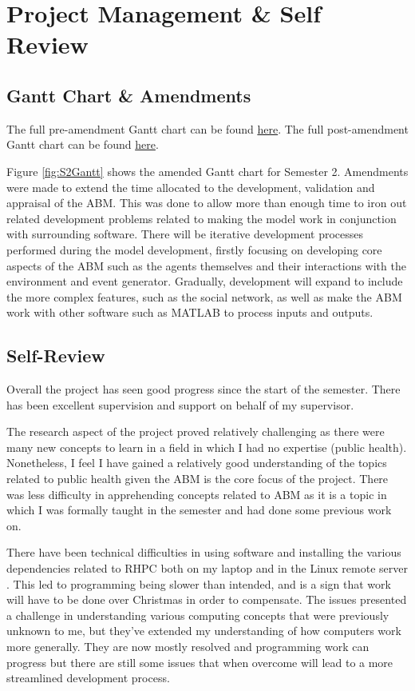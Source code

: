 \chapter{Project Management \& Self Review}

\section{Gantt Chart \& Amendments}
The full pre-amendment Gantt chart can be found \href{https://www.notion.so/zuddas/9c097f57d9d844da8fc7f8733b38289f?v=61d021af0d9d40ebab7b2a6fbe6b3bd8}{here}. 
The full post-amendment Gantt chart can be found \href{https://www.notion.so/zuddas/ee42fe3d801947d08c59b69aa2e4f0cd?v=13936a7a4a4a4cff9e9fc01ff24508cb}{here}. 

Figure \ref{fig:S2Gantt} shows the amended Gantt chart for Semester 2. Amendments were made to extend the time allocated to the development, validation and appraisal of the \ac{ABM}. This was done to allow more than enough time to iron out related development problems related to making the model work in conjunction with surrounding software. There will be iterative development processes performed during the model development, firstly focusing on developing core aspects of the \ac{ABM} such as the agents themselves and their interactions with the environment and event generator. Gradually, development will expand to include the more complex features, such as the social network, as well as make the \ac{ABM} work with other software such as MATLAB to process inputs and outputs. 



\section{Self-Review}


Overall the project has seen good progress since the start of the semester. There has been excellent supervision and support on behalf of my supervisor. 

The research aspect of the project proved relatively challenging as there were many new concepts to learn in a field in which I had no expertise (public health). Nonetheless, I feel I have gained a relatively good understanding of the topics related to public health given the \ac{ABM} is the core focus of the project. There was less difficulty in apprehending concepts related to \ac{ABM} as it is a topic in which I was formally taught in the semester and had done some previous work on. 

There have been technical difficulties in using software and installing the various dependencies related to \ac{RHPC} both on my laptop and in the Linux remote server \cite{repasthpc}. This led to programming being slower than intended, and is a sign that work will have to be done over Christmas in order to compensate. The issues presented a challenge in understanding various computing concepts that were previously unknown to me, but they've extended my understanding of how computers work more generally. They are now mostly resolved and programming work can progress but there are still some issues that when overcome will lead to a more streamlined development process. 
